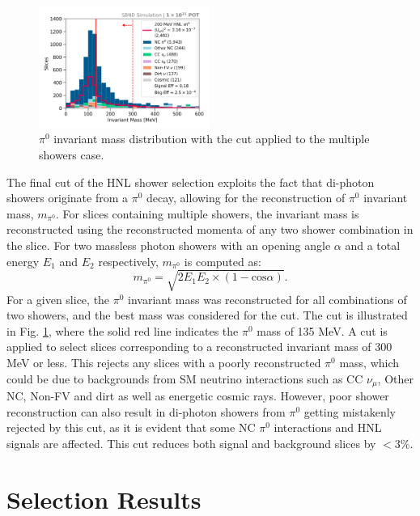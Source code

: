 \begin{figure}[b!]
        \centering 
        \includegraphics[width=0.495\textwidth]{pizero_mass_precut}
	\caption[Neutral Pion Invariant Mass Cut]{
	$\pi^0$ invariant mass distribution with the cut applied to the multiple showers case.
	}
        \label{fig:mass_cut}
\end{figure}

The final cut of the HNL shower selection exploits the fact that di-photon showers originate from a $\pi^0$ decay, allowing for the reconstruction of $\pi^0$ invariant mass, $m_{\pi^0}$.
For slices containing multiple showers, the invariant mass is reconstructed using the reconstructed momenta of any two shower combination in the slice.
For two massless photon showers with an opening angle $\alpha$ and a total energy $E_1$ and $E_2$ respectively, $m_{\pi^0}$ is computed as:
\begin{equation}
	m_{\pi^0} = \sqrt{2 E_1 E_2 \times (1 - \mbox{cos}\alpha)}.
\end{equation}
For a given slice, the $\pi^0$ invariant mass was reconstructed for all combinations of two showers, and the best mass was considered for the cut.
The cut is illustrated in Fig. \ref{fig:mass_cut}, where the solid red line indicates the $\pi^0$ mass of 135 MeV.
A cut is applied to select slices corresponding to a reconstructed invariant mass of 300 MeV or less.
This rejects any slices with a poorly reconstructed $\pi^0$ mass, which could be due to backgrounds from 
SM neutrino interactions such as CC $\nu_\mu$, Other NC, Non-FV and dirt as well as energetic cosmic rays.
However, poor shower reconstruction can also result in di-photon showers from $\pi^0$ getting mistakenly rejected by this cut, as it is evident that some NC $\pi^0$ interactions and HNL signals are affected.
This cut reduces both signal and background slices by $< 3 \%$.


\section{Selection Results}
\label{sec:select_result}

